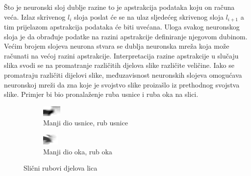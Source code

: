 \documentclass[times, utf8, zavrsni,numeric,pstricks]{fer}
\begin{document}
Što je neuronski sloj dublje razine to je apstrakcija podataka koju on računa veća. Izlaz skrivenog $l_i$ sloja poslat će se na ulaz sljedećeg skrivenog sloja $l_{i+1}$ a tim prijelazom apstrakcija podataka će biti uvećana. Uloga svakog neuronskog sloja je da obrađuje podatke na razini apstrakcije definiranje njegovom dubinom. Većim brojem slojeva neurona stvara se dublja neuronska mreža koja može računati na većoj razini apstrakcije. Interpretacija razine apstrakcije u slučaju slika svodi se na promatranje različitih djelova slike različite veličine. Iako se promatraju različiti dijelovi slike, međuzavisnost neuronskih slojeva omogućava neuronskoj mreži da zna koje je svojstvo slike proizašlo iz prethodnog svojstva slike. Primjer bi bio pronalaženje ruba usnice i ruba oka na slici.

\begin{figure}[H]
	\begin{subfigure}[b]{0.5\linewidth}
	  	\centering
		\includegraphics[width=\linewidth, height=0.3\paperheight, keepaspectratio]{usna_corner.png}
		\caption{Manji dio usnice, rub usnice}		
	\end{subfigure}
	\begin{subfigure}[b]{0.5\linewidth}
	  	\centering
		\includegraphics[width=\linewidth, height=0.3\paperheight, keepaspectratio]{oko_corner.png}
		\caption{Manji dio oka, rub oka}
	\end{subfigure}	
	\caption{Slični rubovi djelova lica}	
	\label{fig:npy_array}
\end{figure}
\end{document}
